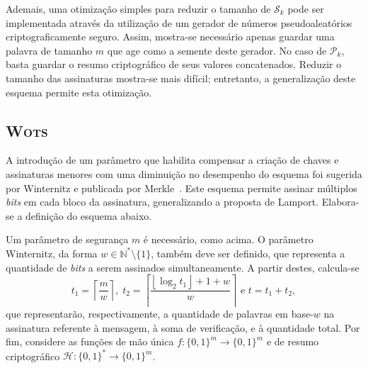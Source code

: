 \documentclass[12pt,notitlepage]{report}
\newcommand{\hh}{\mathcal{H}}
\newcommand{\pk}{\mathcal{P}_k}
\newcommand{\sk}{\mathcal{S}_k}
\newcommand{\binwds}[1]{\{0, 1\}^{#1}}
\newcommand{\fhash}[1]{\hh{} : \binwds{*} \longrightarrow \binwds{#1}}
\newcommand{\wots}{\textsc{Wots}}
\begin{document}
Ademais, uma otimização simples para reduzir o tamanho de $\sk{}$ pode
ser implementada através da utilização de um gerador de números
pseudoaleatórios criptograficamente seguro. Assim, mostra-se necessário apenas
guardar uma palavra de tamanho $m$ que age como a semente deste gerador. No
caso de $\pk{}$, basta guardar o resumo criptográfico de seus valores
concatenados. Reduzir o tamanho das assinaturas mostra-se mais difícil;
entretanto, a generalização deste esquema permite esta otimização.

\subsection{\wots{}}
\label{subsection:wots}

A introdução de um parâmetro que habilita compensar a criação de chaves e
assinaturas menores com uma diminuição no desempenho do esquema foi sugerida
por Winternitz e publicada por Merkle~\cite{Merkle:1989:CDS:118209.118230}.
Este esquema permite assinar múltiplos \emph{bits} em
cada bloco da assinatura, generalizando a proposta de Lamport. Elabora-se a
definição do esquema abaixo.

Um parâmetro de segurança $m$ é necessário, como acima. O parâmetro Winternitz,
da forma $w \in \mathbb{N}^{*}\setminus\{1\}$, também deve ser definido, que representa a
quantidade de \emph{bits} a serem assinados simultaneamente.  A partir destes,
calcula-se $$t_1 = \left\lceil \frac{m}{w} \right\rceil, \; t_2 = \left\lceil
\frac{\left\lfloor \log_2 t_1 \right\rfloor + 1 + w}{w} \right\rceil \text{ e }
t = t_1 + t_2,$$ que representarão, respectivamente, a quantidade de palavras
em base-$w$ na assinatura referente à mensagem, à soma de verificação, e à
quantidade total.  Por fim, considere as funções de mão única $f : \binwds{m}
\longrightarrow \binwds{m}$ e de resumo criptográfico $\fhash{m}$.
\end{document}
